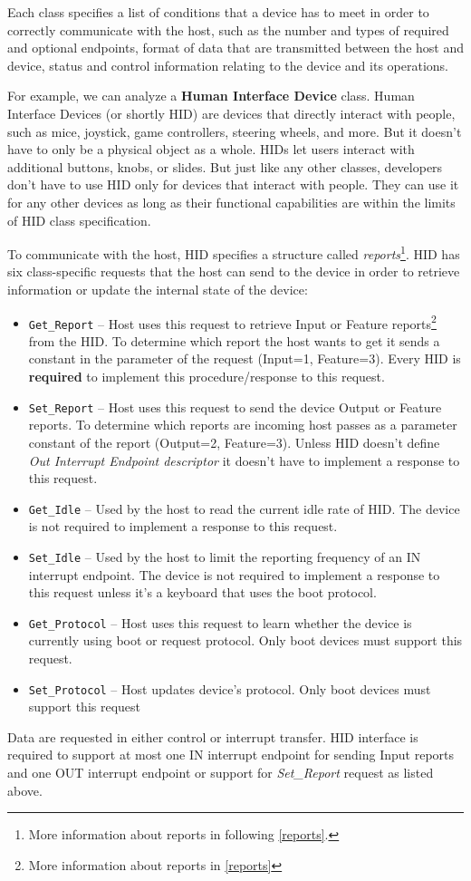 Each class specifies a list of conditions that a device has to meet in order to correctly communicate with the host, such as the number and types of required and optional endpoints, format of data that are transmitted between the host and device, status and control information relating to the device and its operations.

For example, we can analyze a \textbf{Human Interface Device} class. Human Interface Devices (or shortly HID) are devices that directly interact with people, such as mice, joystick, game controllers, steering wheels, and more. But it doesn't have to only be a physical object as a whole. HIDs let users interact with additional buttons, knobs, or slides. But just like any other classes, developers don't have to use HID only for devices that interact with people. They can use it for any other devices as long as their functional capabilities are within the limits of HID class
specification.

To communicate with the host, HID specifies a structure called \emph{reports}\footnote{More information about reports in following \autoref{reports}.}. HID has six class-specific requests that the host can send to the device in order to retrieve information or update the internal state of the device:
\begin{itemize}
    \item \verb|Get_Report| \--- Host uses this request to retrieve Input or Feature reports\footnote{More information about reports in \autoref{reports}} from the HID. To determine which report the host wants to get it sends a constant in the parameter of the request (Input=1, Feature=3). Every HID is \textbf{required} to implement this procedure/response to this request.
    \item \verb|Set_Report| \--- Host uses this request to send the device Output or Feature reports. To determine which reports are incoming host passes as a parameter constant of the report (Output=2, Feature=3). Unless HID doesn't define \emph{Out Interrupt Endpoint descriptor} it doesn't have to implement a response to this request.
    \item \verb|Get_Idle| \--- Used by the host to read the current idle rate of HID. The device is not required to implement a response to this request.
    \item \verb|Set_Idle| \--- Used by the host to limit the reporting frequency of an IN interrupt endpoint. The device is not required to implement a response to this request unless it's a keyboard that uses the boot protocol.
    \item \verb|Get_Protocol| \--- Host uses this request to learn whether the device is currently using boot or request protocol. Only boot devices must support this request.
    \item \verb|Set_Protocol| \--- Host updates device's protocol. Only boot devices must support this request
\end{itemize}
Data are requested in either control or interrupt transfer. HID interface is required to support at most one IN interrupt endpoint for sending Input reports and one OUT interrupt endpoint or support for \emph{Set\_Report} request as listed above.

